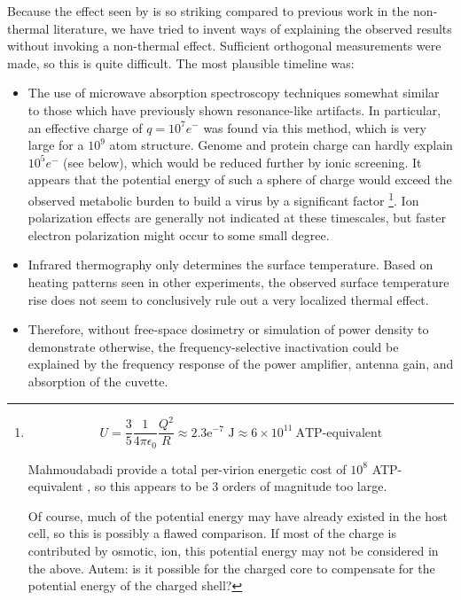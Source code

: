 \documentclass[paper.tex]{subfiles}
\begin{document}
\begin{multicols}{1}
Because the effect seen by\cite{Efficient2015} is so striking compared to previous work in the non-thermal literature, we have tried to invent ways of explaining the observed results without invoking a non-thermal effect. Sufficient orthogonal measurements were made, so this is quite difficult. The most plausible timeline was:
\begin{itemize}
	\item The use of microwave absorption spectroscopy techniques somewhat similar to those which have previously shown resonance-like artifacts\cite{Resonances1987}. In particular, an effective charge of $q=10^7 e^-$ was found via this method, which is very large for a $10^9$ atom structure.  Genome and protein charge can hardly explain $10^5 e^-$ (see below), which would be reduced further by ionic screening. It appears that the potential energy of such a sphere of charge would exceed the observed metabolic burden to build a virus by a significant factor \footnote{
		$$ U = \frac{3}{5}  \frac{1}{4 \pi \epsilon_0} \frac{Q^2}{R} \approx 2.3\text{e}^{-7} \text{ J} \approx 6 \times 10^{11}\  \text{ATP-equivalent} $$
		
		
		Mahmoudabadi\cite{Energetic2017} provide a total per-virion energetic cost of $10^8 $ ATP-equivalent , so this appears to be 3 orders of magnitude too large.
		
		Of course, much of the potential energy may have already existed in the host cell, so this is possibly a flawed comparison. If most of the charge is contributed by osmotic, ion, this potential energy may not be considered in the above. Autem: is it possible for the charged core to compensate for the potential energy of the charged shell?}. Ion polarization effects are generally not indicated at these timescales\cite{ICNIRP2020}, but faster electron polarization might occur to some small degree. 
	
	
	
	
	\item Infrared thermography only determines the surface temperature. Based on heating patterns seen in other experiments\cite{Effects1950}, the observed surface temperature rise does not seem to conclusively rule out a very localized thermal effect. 
	\item Therefore, without free-space dosimetry or simulation of power density to demonstrate otherwise, the frequency-selective inactivation could be explained by the frequency response of the power amplifier, antenna gain, and absorption of the cuvette.
\end{itemize}


\end{multicols}
\end{document}
